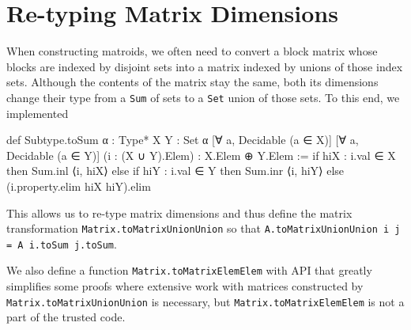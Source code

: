 \section{Re-typing Matrix Dimensions}

When constructing matroids, we often need to convert a block matrix whose blocks are indexed by disjoint sets into a matrix indexed by unions of those index sets. Although the contents of the matrix stay the same, both its dimensions change their type from a \texttt{Sum} of sets to a \texttt{Set} union of those sets. To this end, we implemented
\begin{leancode}
def Subtype.toSum {α : Type*} {X Y : Set α}
    [∀ a, Decidable (a ∈ X)]
    [∀ a, Decidable (a ∈ Y)]
    (i : (X ∪ Y).Elem) :
    X.Elem ⊕ Y.Elem :=
  if hiX : i.val ∈ X then Sum.inl ⟨i, hiX⟩ else
  if hiY : i.val ∈ Y then Sum.inr ⟨i, hiY⟩ else
  (i.property.elim hiX hiY).elim
\end{leancode}
This allows us to re-type matrix dimensions and thus define the matrix transformation \texttt{Matrix.toMatrixUnionUnion} so that \texttt{A.toMatrixUnionUnion i j = A i.toSum j.toSum}.

We also define a function \texttt{Matrix.toMatrixElemElem} with API that greatly simplifies some proofs where extensive work with matrices constructed by \texttt{Matrix.toMatrixUnionUnion} is necessary, but \texttt{Matrix.toMatrixElemElem} is not a part of the trusted code.

